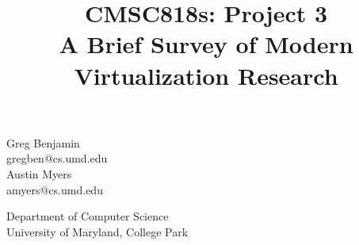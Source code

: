 \documentclass[10pt]{article}
\begin{document}
\title{CMSC818s: Project 3 \\
A Brief Survey of Modern Virtualization Research}
\author{}
\date{}

\maketitle

\vspace{-2cm}

\begin{center}
\begin{multicols}{2}
  Greg Benjamin \\
  gregben@cs.umd.edu \\
  Austin Myers \\
  amyers@cs.umd.edu
\end{multicols}
Department of Computer Science \\
University of Maryland, College Park
\end{center}
\end{document}
